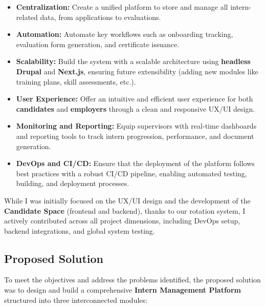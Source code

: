 \begin{itemize}
  \item \textbf{Centralization:} Create a unified platform to store and manage all intern-related data, from applications to evaluations.
  \item \textbf{Automation:} Automate key workflows such as onboarding tracking, evaluation form generation, and certificate issuance.
  \item \textbf{Scalability:} Build the system with a scalable architecture using \textbf{headless Drupal} and \textbf{Next.js}, ensuring future extensibility (adding new modules like training plans, skill assessments, etc.).
  \item \textbf{User Experience:} Offer an intuitive and efficient user experience for both \textbf{candidates} and \textbf{employers} through a clean and responsive UX/UI design.
  \item \textbf{Monitoring and Reporting:} Equip supervisors with real-time dashboards and reporting tools to track intern progression, performance, and document generation.
  \item \textbf{DevOps and CI/CD:} Ensure that the deployment of the platform follows best practices with a robust CI/CD pipeline, enabling automated testing, building, and deployment processes.
\end{itemize}

\medskip

\noindent
While I was initially focused on the UX/UI design and the development of the \textbf{Candidate Space} (frontend and backend), thanks to our rotation system, I actively contributed across all project dimensions, including DevOps setup, backend integrations, and global system testing.

\subsection{Proposed Solution}
\noindent
To meet the objectives and address the problems identified, the proposed solution was to design and build a comprehensive \textbf{Intern Management Platform} structured into three interconnected modules:

